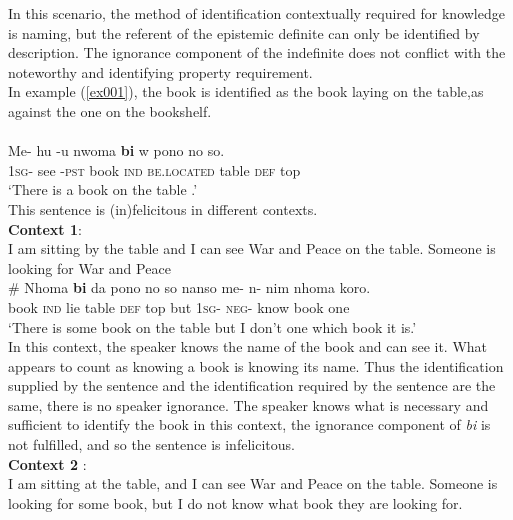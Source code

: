 \documentclass[output=paper,
modfonts
]{langsci/langscibook}
\begin{document}
 \z  
In this scenario, the method of identification contextually required for knowledge is naming, but the referent of the epistemic definite can only be identified by description. The ignorance component of the indefinite does not conflict with the noteworthy and identifying property requirement.\\

In example (\ref{ex001}), the book is identified as the book laying on the table,as against the one on the bookshelf.  \\
\ea\label{ex001}\\
\gll Me- hu -u nwoma \textbf{bi} w pono no so.\\
	     \textsc{1sg}- see -\textsc{pst}  book \textsc{ind}  \textsc{be.located} table \textsc{def}  top\\

\glt `There is a book on the table .'\\

 \z 
This sentence is (in)felicitous in different contexts. \\
\textbf{Context 1}:\\
I am sitting by the table and I can see War and Peace on the table. Someone is looking for War and Peace    
\ea\label{ex00}\\
\gll \# Nhoma \textbf{bi} da pono no so nanso me- n- nim nhoma koro.\\
	     {} book \textsc{ind}  lie table \textsc{def}  top but \textsc{1sg}- \textsc{neg}- know book one\\

\glt `There is some book on the table but I don't one which book it is.'\\

 \z  In this context, the speaker knows the name of the book and can see it. What appears to count as knowing a book is knowing its name. Thus the identification supplied by the sentence and the identification required by the sentence are the same, there is no speaker ignorance. The speaker knows what is necessary and sufficient to identify the book in this context, the ignorance component of \emph{bi} is not fulfilled, and so the sentence is infelicitous. \\

\textbf{Context 2} :\\
I am sitting at the table, and I can see War and Peace on the table. Someone is looking for some book, but I do not know what book they are looking for.  
\end{document}
